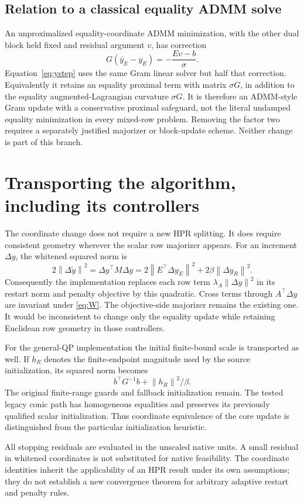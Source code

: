 \documentclass[11pt]{article}
\newcommand{\norm}[1]{\left\lVert#1\right\rVert}
\begin{document}
\subsection{Relation to a classical equality ADMM solve}
An unproximalized equality-coordinate ADMM minimization, with the other dual
block held fixed and residual argument $v$, has correction
\[
 G(\bar y_E-y_E)=-\frac{Ev-b}{\sigma}.
\]
Equation~\eqref{eq:ystep} uses the same Gram linear solver but half that
correction. Equivalently it retains an equality proximal term with matrix
$\sigma G$, in addition to the equality augmented-Lagrangian curvature
$\sigma G$. It is therefore an ADMM-style Gram update with a conservative
proximal safeguard, not the literal undamped equality minimization in every
mixed-row problem. Removing the factor two requires a separately justified
majorizer or block-update scheme. Neither change is part of this branch.

\section{Transporting the algorithm, including its controllers}
The coordinate change does not require a new HPR splitting. It does require
consistent geometry wherever the scalar row majorizer appears. For an increment
$\Delta y$, the whitened squared norm is
\[
 2\norm{\Delta\widetilde y}^2
 =\Delta y^\top M\Delta y
 =2\norm{E^\top\Delta y_E}^2+2\beta\norm{\Delta y_R}^2.
\]
Consequently the implementation replaces each row term
$\lambda_A\norm{\Delta y}^2$ in its restart norm and penalty objective by this
quadratic. Cross terms through $A^\top\Delta y$ are invariant under
\eqref{eq:W}. The objective-side majorizer remains the existing one. It would
be inconsistent to change only the equality update while retaining Euclidean
row geometry in those controllers.

For the general-QP implementation the initial finite-bound scale is transported
as well. If $h_R$ denotes the finite-endpoint magnitude used by the source
initialization, its squared norm becomes
\[
 b^\top G^{-1}b+\norm{h_R}^2/\beta.
\]
The original finite-range guards and fallback initialization remain. The tested
legacy conic path has homogeneous equalities and preserves its previously
qualified scalar initialization. Thus coordinate equivalence of the core update
is distinguished from the particular initialization heuristic.

All stopping residuals are evaluated in the unscaled native units. A small
residual in whitened coordinates is not substituted for native feasibility.
The coordinate identities inherit the applicability of an HPR result under its
own assumptions; they do not establish a new convergence theorem for arbitrary
adaptive restart and penalty rules.
\end{document}
